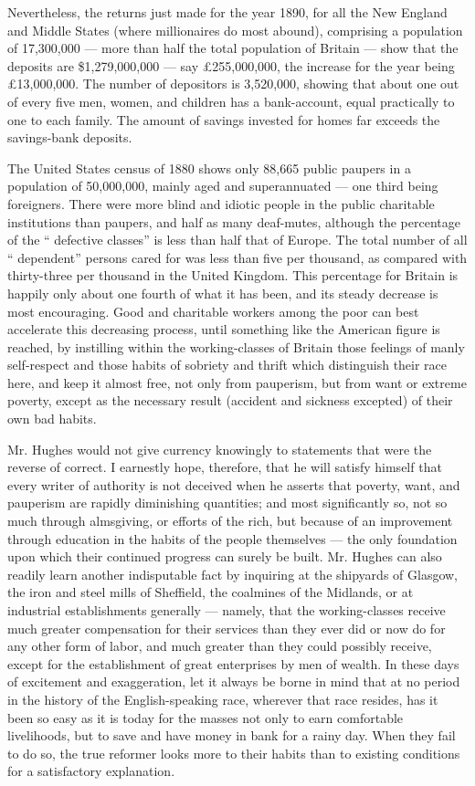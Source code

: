 \documentclass[11pt,openany]{book}
\begin{document}
Nevertheless, the returns just made for the year 1890, for all the New England and Middle States (where millionaires do most abound), comprising a population of 17,300,000 --- more than half the total population of Britain --- show that the deposits are \$1,279,000,000 --- say £255,000,000, the increase for the year being £13,000,000. The number of depositors is 3,520,000, showing that about one out of every five men, women, and children has a bank-account, equal practically to one to each family. The amount of savings invested for homes far exceeds the savings-bank deposits.

The United States census of 1880 shows only 88,665 public paupers in a population of 50,000,000, mainly aged and superannuated --- one third being foreigners. There were more blind and idiotic people in the public charitable institutions than paupers, and half as many deaf-mutes, although the percentage of the `` defective classes'' is less than half that of Europe. The total number of all `` dependent'' persons cared for was less than five per thousand, as compared with thirty-three per thousand in the United Kingdom. This percentage for Britain is happily only about one fourth of what it has been, and its steady decrease is most encouraging. Good and charitable workers among the poor can best accelerate this decreasing process, until something like the American figure is reached, by instilling within the working-classes of Britain those feelings of manly self-respect and those habits of sobriety and thrift which distinguish their race here, and keep it almost free, not only from pauperism, but from want or extreme poverty, except as the necessary result (accident and sickness excepted) of their own bad habits.

Mr. Hughes would not give currency knowingly to statements that were the reverse of correct. I earnestly hope, therefore, that he will satisfy himself that every writer of authority is not deceived when he asserts that poverty, want, and pauperism are rapidly diminishing quantities; and most significantly so, not so much through almsgiving, or efforts of the rich, but because of an improvement through education in the habits of the people themselves --- the only foundation upon which their continued progress can surely be built. Mr. Hughes can also readily learn another indisputable fact by inquiring at the shipyards of Glasgow, the iron and steel mills of Sheffield, the coalmines of the Midlands, or at industrial establishments generally --- namely, that the working-classes receive much greater compensation for their services than they ever did or now do for any other form of labor, and much greater than they could possibly receive, except for the establishment of great enterprises by men of wealth. In these days of excitement and exaggeration, let it always be borne in mind that at no period in the history of the English-speaking race, wherever that race resides, has it been so easy as it is today for the masses not only to earn comfortable livelihoods, but to save and have money in bank for a rainy day. When they fail to do so, the true reformer looks more to their habits than to existing conditions for a satisfactory explanation.
\end{document}
